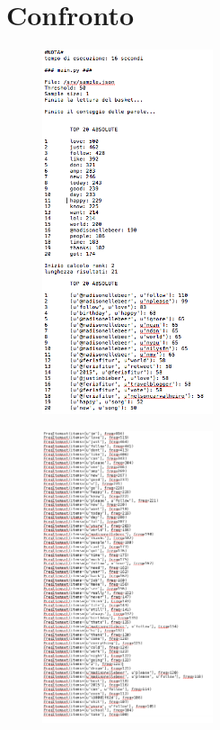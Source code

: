\documentclass{article}
\begin{document}
\section{Confronto}
\begin{figure}[h]
  \begin{center}
  \includegraphics[width=190px]{sample1.jpg}
  \end{center}
\end{figure}


\begin{figure}[h]
  \begin{center}
  \includegraphics[width=190px]{samplefp}
  \end{center}
\end{figure}
\end{document}
